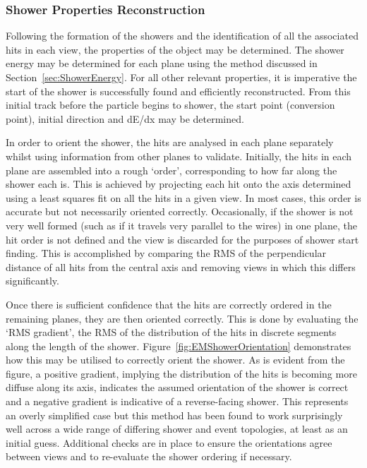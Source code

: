 \subsubsection{Shower Properties Reconstruction}\label{sec:EMShowerProperties}

Following the formation of the showers and the identification of all the associated hits in each view, the properties of the object may be determined.  The shower energy may be determined for each plane using the method discussed in Section~\ref{sec:ShowerEnergy}.  For all other relevant properties, it is imperative the start of the shower is successfully found and efficiently reconstructed.  From this initial track before the particle begins to shower, the start point (conversion point), initial direction and dE/dx may be determined.

In order to orient the shower, the hits are analysed in each plane separately whilst using information from other planes to validate.  Initially, the hits in each plane are assembled into a rough `order', corresponding to how far along the shower each is.  This is achieved by projecting each hit onto the axis determined using a least squares fit on all the hits in a given view.  In most cases, this order is accurate but not necessarily oriented correctly.  Occasionally, if the shower is not very well formed (such as if it travels very parallel to the wires) in one plane, the hit order is not defined and the view is discarded for the purposes of shower start finding.  This is accomplished by comparing the RMS of the perpendicular distance of all hits from the central axis and removing views in which this differs significantly.

Once there is sufficient confidence that the hits are correctly ordered in the remaining planes, they are then oriented correctly.  This is done by evaluating the `RMS gradient', the RMS of the distribution of the hits in discrete segments along the length of the shower.  Figure~\ref{fig:EMShowerOrientation} demonstrates how this may be utilised to correctly orient the shower.  As is evident from the figure, a positive gradient, implying the distribution of the hits is becoming more diffuse along its axis, indicates the assumed orientation of the shower is correct and a negative gradient is indicative of a reverse-facing shower.  This represents an overly simplified case but this method has been found to work surprisingly well across a wide range of differing shower and event topologies, at least as an initial guess.  Additional checks are in place to ensure the orientations agree between views and to re-evaluate the shower ordering if necessary.

